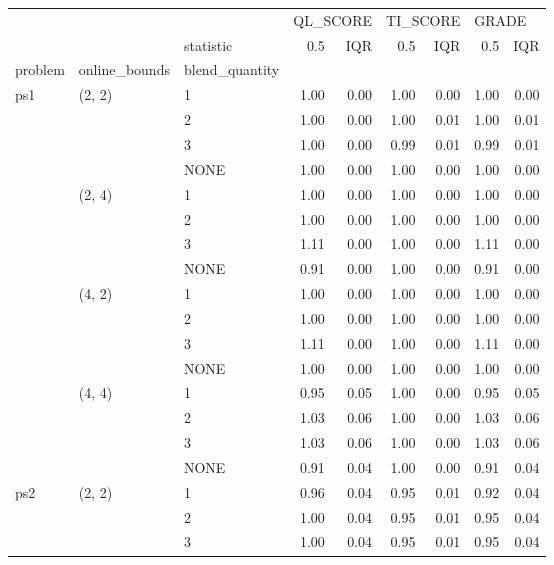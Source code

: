 \begin{tabular}{lllrrrrrr}
\toprule
    &        & {} & \multicolumn{2}{l}{QL\_SCORE} & \multicolumn{2}{l}{TI\_SCORE} & \multicolumn{2}{l}{GRADE} \\
    &        & statistic &      0.5 &  IQR &      0.5 &  IQR &   0.5 &  IQR \\
problem & online\_bounds & blend\_quantity &          &      &          &      &       &      \\
\midrule
ps1 & (2, 2) & 1 &     1.00 & 0.00 &     1.00 & 0.00 &  1.00 & 0.00 \\
    &        & 2 &     1.00 & 0.00 &     1.00 & 0.01 &  1.00 & 0.01 \\
    &        & 3 &     1.00 & 0.00 &     0.99 & 0.01 &  0.99 & 0.01 \\
    &        & NONE &     1.00 & 0.00 &     1.00 & 0.00 &  1.00 & 0.00 \\
    & (2, 4) & 1 &     1.00 & 0.00 &     1.00 & 0.00 &  1.00 & 0.00 \\
    &        & 2 &     1.00 & 0.00 &     1.00 & 0.00 &  1.00 & 0.00 \\
    &        & 3 &     1.11 & 0.00 &     1.00 & 0.00 &  1.11 & 0.00 \\
    &        & NONE &     0.91 & 0.00 &     1.00 & 0.00 &  0.91 & 0.00 \\
    & (4, 2) & 1 &     1.00 & 0.00 &     1.00 & 0.00 &  1.00 & 0.00 \\
    &        & 2 &     1.00 & 0.00 &     1.00 & 0.00 &  1.00 & 0.00 \\
    &        & 3 &     1.11 & 0.00 &     1.00 & 0.00 &  1.11 & 0.00 \\
    &        & NONE &     1.00 & 0.00 &     1.00 & 0.00 &  1.00 & 0.00 \\
    & (4, 4) & 1 &     0.95 & 0.05 &     1.00 & 0.00 &  0.95 & 0.05 \\
    &        & 2 &     1.03 & 0.06 &     1.00 & 0.00 &  1.03 & 0.06 \\
    &        & 3 &     1.03 & 0.06 &     1.00 & 0.00 &  1.03 & 0.06 \\
    &        & NONE &     0.91 & 0.04 &     1.00 & 0.00 &  0.91 & 0.04 \\
ps2 & (2, 2) & 1 &     0.96 & 0.04 &     0.95 & 0.01 &  0.92 & 0.04 \\
    &        & 2 &     1.00 & 0.04 &     0.95 & 0.01 &  0.95 & 0.04 \\
    &        & 3 &     1.00 & 0.04 &     0.95 & 0.01 &  0.95 & 0.04 \\

\end{tabular}
